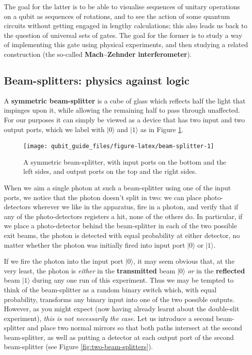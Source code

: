 \documentclass[fleqn,a4paper]{article}
\theoremstyle{definition}
\theoremstyle{definition}
\theoremstyle{definition}
\theoremstyle{definition}
\theoremstyle{remark}
\begin{document}
The goal for the latter is to be able to visualise sequences of unitary operations on a qubit as sequences of rotations, and to see the action of some quantum circuits without getting engaged in lengthy calculations; this also leads us back to the question of universal sets of gates.
The goal for the former is to study a way of implementing this gate using physical experiments, and then studying a related construction (the so-called \textbf{Mach--Zehnder interferometer}).

\hypertarget{beamsplitters-against-logic}{%
\subsection{Beam-splitters: physics against logic}\label{beamsplitters-against-logic}}

A \textbf{symmetric beam-splitter} is a cube of glass which reflects half the light that impinges upon it, while allowing the remaining half to pass through unaffected.
For our purposes it can simply be viewed as a device that has two input and two output ports, which we label with \(|0\rangle\) and \(|1\rangle\) as in Figure \ref{fig:beam-splitter}.

\begin{figure}[H]

{\centering \texttt{[image: qubit\_guide\_files/figure-latex/beam-splitter-1]} 

}

\caption{A symmetric beam-splitter, with input ports on the bottom and the left sides, and output ports on the top and the right sides.}\label{fig:beam-splitter}
\end{figure}

When we aim a single photon at such a beam-splitter using one of the input ports, we notice that the photon doesn't split in two: we can place photo-detectors wherever we like in the apparatus, fire in a photon, and verify that if any of the photo-detectors registers a hit, none of the others do.
In particular, if we place a photo-detector behind the beam-splitter in each of the two possible exit beams, the photon is detected with equal probability at either detector, no matter whether the photon was initially fired into input port \(|0\rangle\) or \(|1\rangle\).

If we fire the photon into the input port \(|0\rangle\), it may seem obvious that, at the very least, the photon is \emph{either} in the \textbf{transmitted} beam \(|0\rangle\) \emph{or} in the \textbf{reflected} beam \(|1\rangle\) during any one run of this experiment.
Thus we may be tempted to think of the beam-splitter as a random binary switch which, with equal probability, transforms any binary input into one of the two possible outputs.
However, as you might expect (now having already learnt about the double-slit experiment), \emph{this is not necessarily the case}.
Let us introduce a second beam-splitter and place two normal mirrors so that both paths intersect at the second beam-splitter, as well as putting a detector at each output port of the second beam-splitter (see Figure \ref{fig:two-beam-splitters}).
\end{document}

